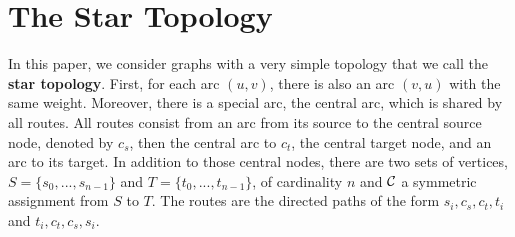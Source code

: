 \documentclass[a4paper,10pt]{article}
\begin{document}
\section{The Star Topology}
  
   
    
      In this paper, we consider graphs with a very simple topology that we call the {\bf star topology}. 
      First, for each arc $(u,v)$, there is also an arc $(v,u)$ with the same weight.
      Moreover, there is a special arc, the central arc, which is shared by all routes.
      All routes consist from an arc from its source to the central source node, denoted by {\bf $c_s$},
      then the central arc to {\bf $c_t$}, the central target node, and an arc to its target. In addition to those central nodes, there are two sets of vertices, $S=\{s_0,...,s_{n-1}\}$ and $T=\{t_0,...,t_{n-1}\}$, of cardinality $n$ and ${\cal C}$ a symmetric assignment from $S$ to $T$. 
      The routes are the directed paths of the form $s_i,c_s,c_t,t_i$ and $t_i,c_t,c_s,s_i$. 
      
      
       \begin{center}
	 

  \end{center}
	
\end{document}
